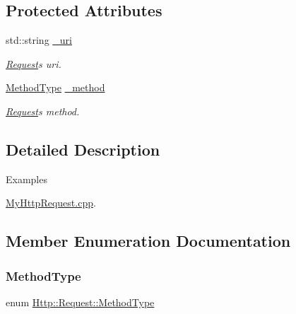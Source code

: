 \subsection*{Protected Attributes}
\begin{DoxyCompactItemize}
\item 
\mbox{\label{classHttp_1_1Request_a3e62c38f894bb8e39ad03ac78531f556}} 
std\+::string \mbox{\hyperlink{classHttp_1_1Request_a3e62c38f894bb8e39ad03ac78531f556}{\+\_\+uri}}
\begin{DoxyCompactList}\small\item\em \mbox{\hyperlink{classHttp_1_1Request}{Request}}\textquotesingle{}s uri. \end{DoxyCompactList}\item 
\mbox{\label{classHttp_1_1Request_af625e2d310f771616d078a7f173097a5}} 
\mbox{\hyperlink{classHttp_1_1Request_acb00e56805e8f946c7240b898d823c4d}{Method\+Type}} \mbox{\hyperlink{classHttp_1_1Request_af625e2d310f771616d078a7f173097a5}{\+\_\+method}}
\begin{DoxyCompactList}\small\item\em \mbox{\hyperlink{classHttp_1_1Request}{Request}}\textquotesingle{}s method. \end{DoxyCompactList}\end{DoxyCompactItemize}


\subsection{Detailed Description}
\begin{Desc}
\item[Examples]\par
\mbox{\hyperlink{MyHttpRequest_8cpp-example}{My\+Http\+Request.\+cpp}}.\end{Desc}


\subsection{Member Enumeration Documentation}
\mbox{\label{classHttp_1_1Request_acb00e56805e8f946c7240b898d823c4d}} 
\subsubsection{\texorpdfstring{MethodType}{MethodType}}
{\footnotesize\ttfamily enum \mbox{\hyperlink{classHttp_1_1Request_acb00e56805e8f946c7240b898d823c4d}{Http\+::\+Request\+::\+Method\+Type}}\hspace{0.3cm}{\ttfamily [strong]}}

